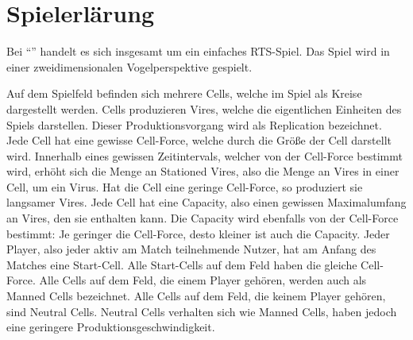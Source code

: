 \section{Spielerlärung}
\label{sec:spielerklaerung}

Bei ``\vires'' handelt es sich insgesamt um ein einfaches RTS-Spiel. 
Das Spiel wird in einer zweidimensionalen Vogelperspektive gespielt.

Auf dem Spielfeld befinden sich mehrere Cells, welche im Spiel als Kreise dargestellt werden.
Cells produzieren Vires, welche die eigentlichen Einheiten des Spiels darstellen. Dieser Produktionsvorgang wird als Replication bezeichnet.
Jede Cell hat eine gewisse Cell-Force, welche durch die Größe der Cell darstellt wird.
Innerhalb eines gewissen Zeitintervals, welcher von der Cell-Force bestimmt wird, erhöht sich die Menge an Stationed Vires, also die Menge an Vires in einer Cell, um ein Virus.
Hat die Cell eine geringe Cell-Force, so produziert sie langsamer Vires.
Jede Cell hat eine Capacity, also einen gewissen Maximalumfang an Vires, den sie enthalten kann.
Die Capacity wird ebenfalls von der Cell-Force bestimmt: Je geringer die Cell-Force, desto kleiner ist auch die Capacity.
Jeder Player, also jeder aktiv am Match teilnehmende Nutzer, hat am Anfang des Matches eine Start-Cell. 
Alle Start-Cells auf dem Feld haben die gleiche Cell-Force.
Alle Cells auf dem Feld, die einem Player gehören, werden auch als Manned Cells bezeichnet.
Alle Cells auf dem Feld, die keinem Player gehören, sind Neutral Cells. Neutral Cells verhalten sich wie Manned Cells, haben jedoch eine geringere Produktionsgeschwindigkeit.

